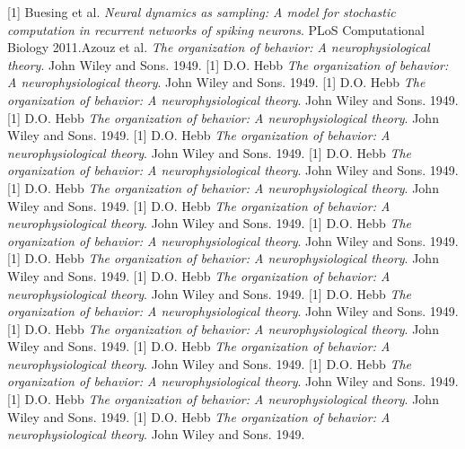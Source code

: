 \documentclass{ucetd}
\begin{document}
\makebibliography

[1] Buesing et al. \textit{Neural dynamics as sampling: A model for stochastic computation in recurrent networks of spiking neurons}. PLoS Computational Biology 2011.\newline
[1] Azouz et al. \textit{The organization of behavior: A neurophysiological theory}. John Wiley and Sons. 1949.
[1] D.O. Hebb \textit{The organization of behavior: A neurophysiological theory}. John Wiley and Sons. 1949.
[1] D.O. Hebb \textit{The organization of behavior: A neurophysiological theory}. John Wiley and Sons. 1949.
[1] D.O. Hebb \textit{The organization of behavior: A neurophysiological theory}. John Wiley and Sons. 1949.
[1] D.O. Hebb \textit{The organization of behavior: A neurophysiological theory}. John Wiley and Sons. 1949.
[1] D.O. Hebb \textit{The organization of behavior: A neurophysiological theory}. John Wiley and Sons. 1949.
[1] D.O. Hebb \textit{The organization of behavior: A neurophysiological theory}. John Wiley and Sons. 1949.
[1] D.O. Hebb \textit{The organization of behavior: A neurophysiological theory}. John Wiley and Sons. 1949.
[1] D.O. Hebb \textit{The organization of behavior: A neurophysiological theory}. John Wiley and Sons. 1949.
[1] D.O. Hebb \textit{The organization of behavior: A neurophysiological theory}. John Wiley and Sons. 1949.
[1] D.O. Hebb \textit{The organization of behavior: A neurophysiological theory}. John Wiley and Sons. 1949.
[1] D.O. Hebb \textit{The organization of behavior: A neurophysiological theory}. John Wiley and Sons. 1949.
[1] D.O. Hebb \textit{The organization of behavior: A neurophysiological theory}. John Wiley and Sons. 1949.
[1] D.O. Hebb \textit{The organization of behavior: A neurophysiological theory}. John Wiley and Sons. 1949.
[1] D.O. Hebb \textit{The organization of behavior: A neurophysiological theory}. John Wiley and Sons. 1949.
[1] D.O. Hebb \textit{The organization of behavior: A neurophysiological theory}. John Wiley and Sons. 1949.
[1] D.O. Hebb \textit{The organization of behavior: A neurophysiological theory}. John Wiley and Sons. 1949.
\end{document}
